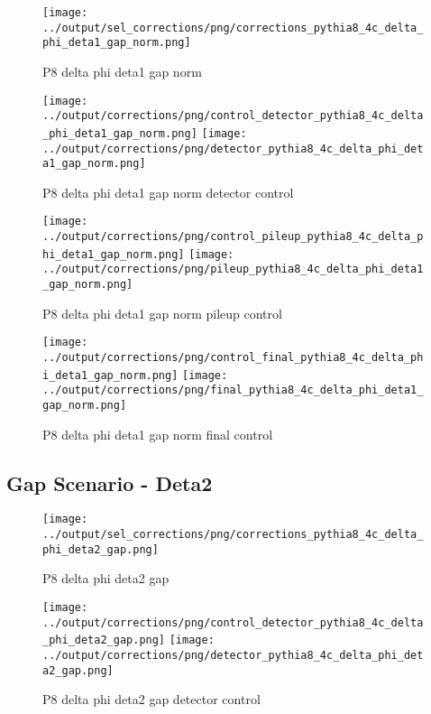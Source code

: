 \documentclass[11pt]{book}
\begin{document}
\begin{figure}[ht]
\centering
\texttt{[image: ../output/sel\_corrections/png/corrections\_pythia8\_4c\_delta\_phi\_deta1\_gap\_norm.png]}
\caption{P8 delta phi deta1 gap norm}
\label{fig:p8_delta_phi_deta1_gap_norm}
\end{figure}

\begin{figure}[ht]
\centering
\texttt{[image: ../output/corrections/png/control\_detector\_pythia8\_4c\_delta\_phi\_deta1\_gap\_norm.png]}
\texttt{[image: ../output/corrections/png/detector\_pythia8\_4c\_delta\_phi\_deta1\_gap\_norm.png]}
\caption{P8 delta phi deta1 gap norm detector control}
\label{fig:p8_delta_phi_deta1_gap_norm_detector_control}
\end{figure}

\begin{figure}[ht]
\centering
\texttt{[image: ../output/corrections/png/control\_pileup\_pythia8\_4c\_delta\_phi\_deta1\_gap\_norm.png]}
\texttt{[image: ../output/corrections/png/pileup\_pythia8\_4c\_delta\_phi\_deta1\_gap\_norm.png]}
\caption{P8 delta phi deta1 gap norm pileup control}
\label{fig:p8_delta_phi_deta1_gap_norm_pileup_control}
\end{figure}


\begin{figure}[ht]
\centering
\texttt{[image: ../output/corrections/png/control\_final\_pythia8\_4c\_delta\_phi\_deta1\_gap\_norm.png]}
\texttt{[image: ../output/corrections/png/final\_pythia8\_4c\_delta\_phi\_deta1\_gap\_norm.png]}
\caption{P8 delta phi deta1 gap norm final control}
\label{fig:p8_delta_phi_deta1_gap_norm_final_control}
\end{figure}



\clearpage
\subsection{Gap Scenario - Deta2}
\begin{figure}[ht]
\centering
\texttt{[image: ../output/sel\_corrections/png/corrections\_pythia8\_4c\_delta\_phi\_deta2\_gap.png]}
\caption{P8 delta phi deta2 gap}
\label{fig:p8_delta_phi_deta2_gap}
\end{figure}


\begin{figure}[ht]
\centering
\texttt{[image: ../output/corrections/png/control\_detector\_pythia8\_4c\_delta\_phi\_deta2\_gap.png]}
\texttt{[image: ../output/corrections/png/detector\_pythia8\_4c\_delta\_phi\_deta2\_gap.png]}
\caption{P8 delta phi deta2 gap detector control}
\label{fig:p8_delta_phi_deta2_gap_detector_control}
\end{figure}
\end{document}
